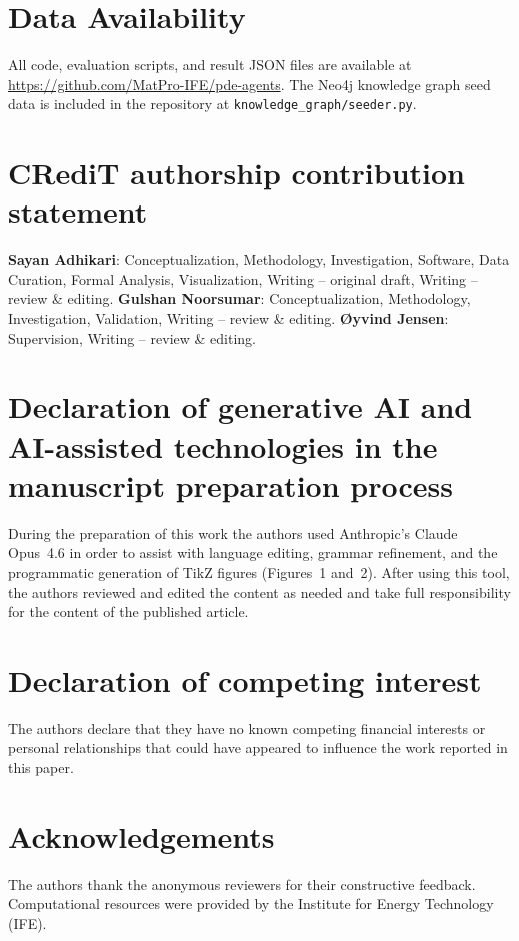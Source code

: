\documentclass[preprint,review,12pt]{elsarticle}
\begin{document}
\section*{Data Availability}
All code, evaluation scripts, and result JSON files are available at
\url{https://github.com/MatPro-IFE/pde-agents}.  The Neo4j knowledge
graph seed data is included in the repository at \texttt{knowledge\_graph/seeder.py}.

\section*{CRediT authorship contribution statement}
\textbf{Sayan Adhikari}: Conceptualization, Methodology, Investigation, Software, Data Curation, Formal Analysis, Visualization, Writing -- original draft, Writing -- review \& editing.
\textbf{Gulshan Noorsumar}: Conceptualization, Methodology, Investigation, Validation, Writing -- review \& editing.
\textbf{\O yvind Jensen}: Supervision, Writing -- review \& editing.

\section*{Declaration of generative AI and AI-assisted technologies in the manuscript preparation process}
During the preparation of this work the authors used Anthropic's Claude
Opus~4.6 in order to assist with language editing, grammar refinement,
and the programmatic generation of TikZ figures (Figures~1 and~2).
After using this tool, the authors reviewed and edited the content as
needed and take full responsibility for the content of the published
article.

\section*{Declaration of competing interest}
The authors declare that they have no known competing financial interests
or personal relationships that could have appeared to influence the work
reported in this paper.

\section*{Acknowledgements}
The authors thank the anonymous reviewers for their constructive feedback.
Computational resources were provided by the Institute for Energy Technology (IFE).
\end{document}
